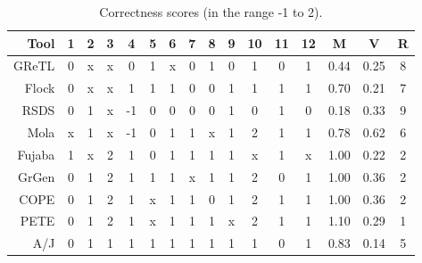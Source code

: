 \begin{table}[tbp]
	\centering
	\begin{tabular}{|r||c|c|c|c|c|c|c|c|c|c|c|c||c|c||c|}
		\hline
		\textbf{Tool} & \textbf{1} & \textbf{2} & \textbf{3} & \textbf{4} & \textbf{5} & \textbf{6} & \textbf{7} & \textbf{8} & \textbf{9} & \textbf{10} & \textbf{11} & \textbf{12} & \textbf{M} & \textbf{V} & \textbf{R} \\
		\hline
		\hline
		GReTL         & 0          & x          & x          & 0          & 1          & x          & 0          & 1          &
0          & 1           & 0           & 1           & 0.44       & 0.25       & 8  \\
		\hline
		Flock         & 0          & x          & x          & 1          & 1          & 1          & 0          & 0          &
1          & 1           & 1           & 1           & 0.70       & 0.21       & 7  \\
		\hline
		RSDS          & 0          & 1          & x          & -1         & 0          & 0          & 0          & 0          &
1          & 0           & 1           & 0           & 0.18       & 0.33       & 9  \\
		\hline
		Mola          & x          & 1          & x          & -1         & 0          & 1          & 1         & x          &
1          & 2           & 1           & 1           & 0.78       & 0.62       & 6  \\
		\hline
		Fujaba        & 1          & x          & 2          & 1          & 0          & 1          & 1          & 1          &
1          & x           & 1           & x           & 1.00       & 0.22       & 2  \\
		\hline
		GrGen         & 0          & 1          & 2          & 1          & 1          & 1          & x          & 1          &
1          & 2           & 0           & 1           & 1.00       & 0.36       & 2  \\
		\hline
		COPE          & 0          & 1          & 2          & 1          & x          & 1          & 1          & 0          &
1          & 2           & 1           & 1           & 1.00       & 0.36       & 2  \\
		\hline
		PETE          & 0          & 1          & 2          & 1          & x          & 1          & 1          & 1          &
x          & 2           & 1           & 1           & 1.10       & 0.29       & 1  \\
		\hline
		A/J           & 0          & 1          & 1          & 1          & 1          & 1          & 1          & 1          &
1          & 1           & 0           & 1           & 0.83       & 0.14       & 5  \\
		\hline
	\end{tabular}
	\caption{Correctness scores (in the range -1 to 2).}
	\label{tab:correctness_scores}
\end{table}

